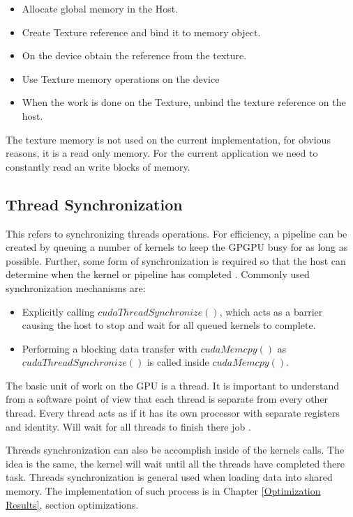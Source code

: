 \begin{itemize}
\item Allocate global memory in the Host.
\item Create Texture reference and bind it to memory object.
\item On the device obtain the reference from the texture.
\item  Use Texture memory operations on the device
\item  When the work is done on the Texture, unbind the texture reference on the host.
\end{itemize}


The texture memory is not used on the current implementation, for obvious reasons, it is a read only memory. For the current application we need to constantly read an write blocks of memory.

\subsection{Thread Synchronization}

This refers to synchronizing threads operations. For efficiency, a pipeline can be created by queuing a number of kernels to keep the GPGPU busy for as long as possible. Further, some form of synchronization is required so that the host can determine when the kernel or pipeline has completed \cite{design}. Commonly used synchronization mechanisms are:

\begin{itemize}
  \item Explicitly calling $cudaThreadSynchronize()$, which acts as a barrier causing the host to stop and wait for all queued kernels to complete.
  \item Performing a blocking data transfer with $cudaMemcpy()$ as $cudaThreadSynchronize()$ is called inside $cudaMemcpy()$.
\end{itemize}

The basic unit of work on the GPU is a thread. It is important to understand from a software point of view that each thread is separate from every other thread. Every thread acts as if it has its own processor with separate registers and identity. Will wait for all threads to finish there job \cite{design}.

Threads synchronization can also be accomplish inside of the kernels calls. The idea is the same, the kernel will wait until all the threads have completed there task. Threads synchronization is general used when loading data into shared memory. The implementation of such process is in Chapter \ref{Optimization Results}, section optimizations.

